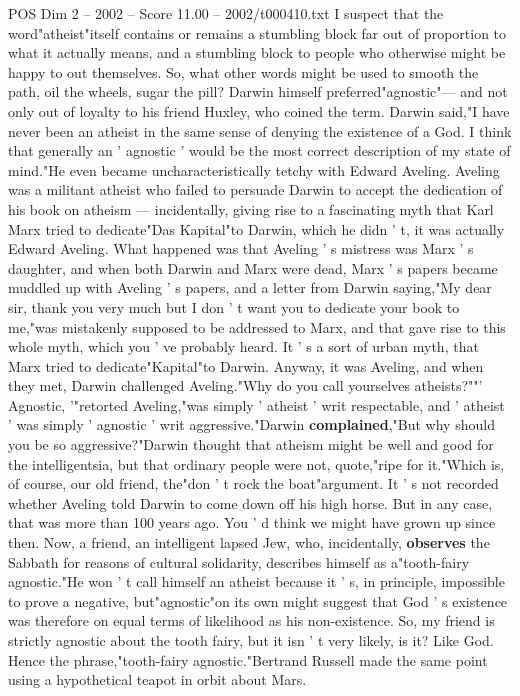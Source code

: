 \begin{textsample}{POS Dim 2 – 2002 – Score 11.00 – 2002/t000410.txt}
I suspect that the word"atheist"itself contains or remains a stumbling block far out of proportion to what it actually means, and a stumbling block to people who otherwise might be happy to out themselves.
So, what other words might be used to smooth the path, oil the wheels, sugar the pill?
Darwin himself preferred"agnostic"— and not only out of loyalty to his friend Huxley, who coined the term.
Darwin said,"I have never been an atheist in the same sense of denying the existence of a God.
I think that generally an ' agnostic ' would be the most correct description of my state of mind."He even became uncharacteristically tetchy with Edward Aveling.
Aveling was a militant atheist who failed to persuade Darwin to accept the dedication of his book on atheism — incidentally, giving rise to a fascinating myth that Karl Marx tried to dedicate"Das Kapital"to Darwin, which he didn ' t, it was actually Edward Aveling.
What happened was that Aveling ' s mistress was Marx ' s daughter, and when both Darwin and Marx were dead, Marx ' s papers became muddled up with Aveling ' s papers, and a letter from Darwin saying,"My dear sir, thank you very much but I don ' t want you to dedicate your book to me,"was mistakenly supposed to be addressed to Marx, and that gave rise to this whole myth, which you ' ve probably heard.
It ' s a sort of urban myth, that Marx tried to dedicate"Kapital"to Darwin.
Anyway, it was Aveling, and when they met, Darwin challenged Aveling."Why do you call yourselves atheists?""' Agnostic, '"retorted Aveling,"was simply ' atheist ' writ respectable, and ' atheist ' was simply ' agnostic ' writ aggressive."Darwin \textbf{complained},"But why should you be so aggressive?"Darwin thought that atheism might be well and good for the intelligentsia, but that ordinary people were not, quote,"ripe for it."Which is, of course, our old friend, the"don ' t rock the boat"argument.
It ' s not recorded whether Aveling told Darwin to come down off his high horse.
But in any case, that was more than 100 years ago.
You ' d think we might have grown up since then.
Now, a friend, an intelligent lapsed Jew, who, incidentally, \textbf{observes} the Sabbath for reasons of cultural solidarity, describes himself as a"tooth-fairy agnostic."He won ' t call himself an atheist because it ' s, in principle, impossible to prove a negative, but"agnostic"on its own might suggest that God ' s existence was therefore on equal terms of likelihood as his non-existence.
So, my friend is strictly agnostic about the tooth fairy, but it isn ' t very likely, is it?
Like God.
Hence the phrase,"tooth-fairy agnostic."Bertrand Russell made the same point using a hypothetical teapot in orbit about Mars.

\end{textsample}
